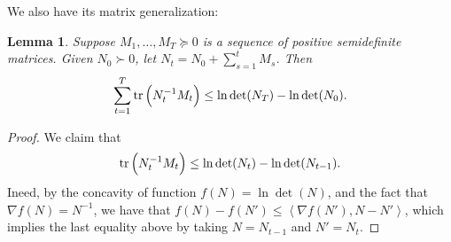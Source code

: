 \documentclass{article}
\newtheorem{lemma}{Lemma}
\newcommand{\inner}[2]{\left\langle #1,#2 \right\rangle}
\begin{document}
We also have its matrix generalization:
\begin{lemma}
  Suppose $M_1, \ldots, M_T \succeq 0$ is a sequence of positive semidefinite matrices. Given $N_0 \succ 0$, let $N_t = N_0 + \sum_{s=1}^t M_s$. Then
  \[ \sum_{t=1}^T \tr\del{N_t^{-1} M_t} \leq \ln\det(N_T) - \ln\det(N_0). \]
  \label{lem:mat-ln}
\end{lemma}
\begin{proof}
We claim that
\[ \tr\del{N_t^{-1} M_t} \leq \ln\det(N_{t}) - \ln\det(N_{t-1}). \]
Ineed, by the concavity of function $f(N) = \ln\det(N)$, and the fact that $\nabla f(N) = N^{-1}$, we have that $f(N) - f(N') \leq \inner{\nabla f(N')}{N - N'}$, which implies the last equality above by taking $N = N_{t-1}$ and $N' = N_t$.
\end{proof}


\end{document}
